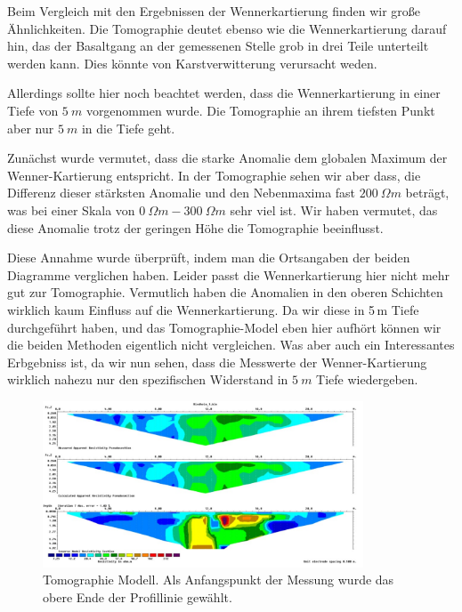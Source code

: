 Beim Vergleich mit den Ergebnissen der Wennerkartierung finden wir große Ähnlichkeiten. Die Tomographie deutet ebenso wie die Wennerkartierung darauf hin, das der Basaltgang an der gemessenen Stelle grob in drei Teile unterteilt werden kann. Dies könnte von Karstverwitterung verursacht weden.

Allerdings sollte hier noch beachtet werden, dass die Wennerkartierung in einer Tiefe von $\SI{5}{m}$ vorgenommen wurde. Die Tomographie an ihrem tiefsten Punkt aber nur $\SI{5}{m}$ in die Tiefe geht. 

Zunächst wurde vermutet, dass die starke Anomalie dem globalen Maximum der Wenner-Kartierung entspricht. In der Tomographie sehen wir aber dass, die Differenz dieser stärksten Anomalie und den Nebenmaxima fast $\SI{200}{\Omega m}$ beträgt, was bei einer Skala von $\SI{0}{\Omega m}- \SI{300}{\Omega m}$ sehr viel ist. Wir haben vermutet, das diese Anomalie trotz der geringen Höhe die Tomographie beeinflusst.


Diese Annahme wurde überprüft, indem man die Ortsangaben der beiden Diagramme verglichen haben. Leider passt die Wennerkartierung hier nicht mehr gut zur Tomographie. Vermutlich haben die Anomalien in den oberen Schichten wirklich kaum Einfluss auf die Wennerkartierung. Da wir diese in 5\,m Tiefe durchgeführt haben, und das Tomographie-Model eben hier aufhört können wir die beiden Methoden eigentlich nicht vergleichen. Was aber auch ein Interessantes Erbgebniss ist, da wir nun sehen, dass die Messwerte der Wenner-Kartierung wirklich nahezu nur den spezifischen Widerstand in $\SI{5}{m}$ Tiefe wiedergeben.






\begin{figure}[h]
\centering
\includegraphics[width=0.85\textwidth]{fig/Tomographie.pdf}
\caption{Tomographie Modell. Als Anfangspunkt der Messung wurde das obere Ende der Profillinie gewählt.}
\label{abb:Tomographie}
\end{figure}
  


